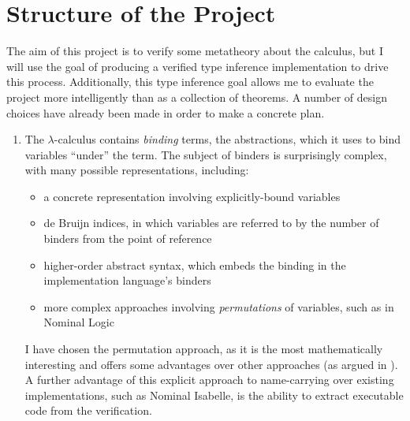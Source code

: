 \documentclass[12pt]{article}
\begin{document}
\section*{Structure of the Project}
The aim of this project is to verify some metatheory about the calculus, but I will use the goal of producing a verified type inference implementation to drive this process.
Additionally, this type inference goal allows me to evaluate the project more intelligently than as a collection of theorems.
A number of design choices have already been made in order to make a concrete plan.
\begin{enumerate}
\item
The \(\lambda\)-calculus contains \emph{binding} terms, the abstractions, which it uses to bind variables ``under'' the term.
The subject of binders is surprisingly complex, with many possible representations, including:
\begin{itemize}
\item
a concrete representation involving explicitly-bound variables
\item
de Bruijn indices, in which variables are referred to by the number of binders from the point of reference
\item
higher-order abstract syntax, which embeds the binding in the implementation language's binders
\item
more complex approaches involving \emph{permutations} of variables, such as in Nominal Logic\parencite{binding}
\end{itemize}
I have chosen the permutation approach, as it is the most mathematically interesting and offers some advantages over other approaches (as argued in \parencite{binding}).
A further advantage of this explicit approach to name-carrying over existing implementations, such as Nominal Isabelle, is the ability to extract executable code from the verification.


\end{enumerate}
\end{document}
